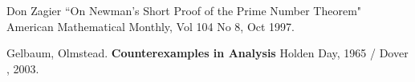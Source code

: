 \documentclass[12pt]{article}
\begin{document}
\begin{thebibliography}{}

\item Don Zagier ``On Newman's Short Proof of the Prime Number Theorem" American Mathematical Monthly, Vol 104 No 8, Oct 1997.

\item Gelbaum, Olmstead. \textbf{Counterexamples in Analysis} Holden Day, 1965 / Dover , 2003.

\end{thebibliography}
\end{document}
